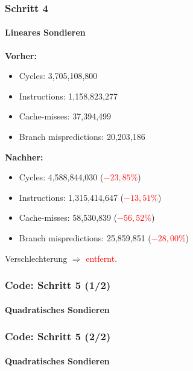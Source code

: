 \documentclass{beamer}
\newcommand{\fail}[1]{\textcolor{red}{#1}}
\begin{document}
  \begin{frame}
  	\frametitle{Schritt 4}
  	\framesubtitle{Lineares Sondieren}
  	\textbf{Vorher:}
  	\begin{itemize}
			\item Cycles: 3,705,108,800 \\
			\item Instructions: 1,158,823,277\\
			\item Cache-misses: 37,394,499\\
			\item Branch mispredictions: 20,203,186\\
		\end{itemize}

		\textbf{Nachher:}
		\begin{itemize}
			\item Cycles: 4,588,844,030 (\fail{$- 23,85 \%$})\\
			\item Instructions: 1,315,414,647 (\fail{$- 13,51 \%$})\\
			\item Cache-misses: 58,530,839 (\fail{$- 56,52 \%$})\\
			\item Branch mispredictions: 25,859,851 (\fail{$- 28,00 \%$})\\
		\end{itemize}
		Verschlechterung $\Rightarrow$ \fail{entfernt}.
  \end{frame}
  
  \begin{frame}
  	\frametitle{Code: Schritt 5 (1/2)}
  	\framesubtitle{Quadratisches Sondieren}
		\sQuadratOne
  \end{frame}

  \begin{frame}
  	\frametitle{Code: Schritt 5 (2/2)}
  	\framesubtitle{Quadratisches Sondieren}
		\sQuadratTwo
  \end{frame}
\end{document}
